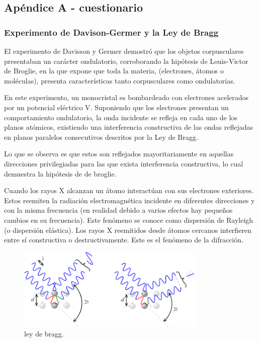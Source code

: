 \documentclass[]{article}
\begin{document}
\newpage

\hypertarget{apuxe9ndice-a---cuestionario}{%
\subsection{Apéndice A -
cuestionario}\label{apuxe9ndice-a---cuestionario}}

\hypertarget{experimento-de-davison-germer-y-la-ley-de-bragg}{%
\subsubsection{Experimento de Davison-Germer y la Ley de
Bragg}\label{experimento-de-davison-germer-y-la-ley-de-bragg}}

El experimento de Davisson y Germer demostró que los objetos
corpusculares presentaban un carácter ondulatorio, corroborando la
hipótesis de Louis-Victor de Broglie, en la que expone que toda la
materia, (electrones, átomos o moléculas), presenta características
tanto corpusculares como ondulatorias.

En este experimento, un monocristal es bombardeado con electrones
acelerados por un potencial eléctrico V. Suponiendo que los electrones
presentan un comportamiento ondulatorio, la onda incidente se refleja en
cada uno de los planos atómicos, existiendo una interferencia
constructiva de las ondas reflejadas en planos paralelos consecutivos
descritos por la Ley de Bragg.

Lo que se observa es que estos son reflejados mayoritariamente en
aquellas direcciones privilegiadas para las que exista interferencia
constructiva, lo cual demuestra la hipótesis de de broglie.

Cuando los rayos X alcanzan un átomo interactúan con sus electrones
exteriores. Estos reemiten la radiación electromagnética incidente en
diferentes direcciones y con la misma frecuencia (en realidad debido a
varios efectos hay pequeños cambios en su frecuencia). Este fenómeno se
conoce como dispersión de Rayleigh (o dispersión elástica). Los rayos X
reemitidos desde átomos cercanos interfieren entre sí constructiva o
destructivamente. Este es el fenómeno de la difracción.

\begin{figure}[H]
\centering
\includegraphics{bragg.png}
\caption{ley de bragg.}
\end{figure}
\end{document}
